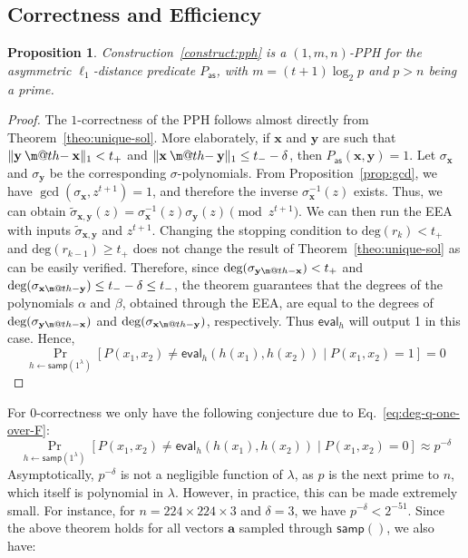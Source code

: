 \documentclass[pdflatex,sn-mathphys-num]{sn-jnl}
\makeatletter
\newcommand{\dotdiv}{\mathbin{\text{\@dotdiv}}}
\newcommand{\@dotdiv}{%
  \ooalign{\hidewidth\raise1ex\hbox{.}\hidewidth\cr$\m@th-$\cr}%
}
\newtheorem{proposition}{Proposition}
\theoremstyle{definition}
\newcommand{\vtr}[1]{\mathbf{#1}}
\newcommand{\norm}[1]{\lVert{#1}\rVert}
\makeatother
\begin{document}
\subsection{Correctness and Efficiency}
\label{subsec:correctness}
\begin{proposition}
\label{prop:scheme-is-pph}
Construction~\ref{construct:pph} is a $(1, m, n)$-PPH for the asymmetric $\ell_1$-distance predicate $P_{\mathsf{as}}$, with $m = (t + 1) \log_2 p$ and $p > n$ being a prime. 
\end{proposition}
\begin{proof}
The $1$-correctness of the PPH follows almost directly from Theorem~\ref{theo:unique-sol}. More elaborately, if $\vtr{x}$ and $\vtr{y}$ are such that $\norm{\vtr{y} \dotdiv \vtr{x}}_1 < t_+$ and $\norm{\vtr{x} \dotdiv \vtr{y}}_1 \leq t_- - \delta$, then $P_{\mathsf{as}}(\vtr{x}, \vtr{y}) = 1$. Let $\sigma_\vtr{x}$ and $\sigma_\vtr{y}$ be the corresponding $\sigma$-polynomials. From Proposition~\ref{prop:gcd}, we have $\gcd (\sigma_\vtr{x}, z^{t+1}) = 1$, and therefore the inverse $\sigma^{-1}_\vtr{x}(z)$ exists. Thus, we can obtain $\tilde{\sigma}_{\vtr{x}, \vtr{y}}(z) =  \sigma^{-1}_\vtr{x}(z) \sigma_\vtr{y}(z) \pmod{z^{t+1}}$. We can then run the EEA with inputs $\tilde{\sigma}_{\vtr{x}, \vtr{y}}$ and $z^{t+1}$. Changing the stopping condition to $\text{deg}(r_{k}) < t_+ $ and $\text{deg}(r_{k-1}) \geq t_+$ does not change the result of Theorem~\ref{theo:unique-sol} as can be easily verified. Therefore, since
$\text{deg}(\sigma_{\vtr{y} \dotdiv \vtr{x}}) < t_+$ and 
$\text{deg}(\sigma_{\vtr{x} \dotdiv \vtr{y}}) \leq t_- - \delta \leq t_-$, the theorem guarantees that the degrees of the polynomials $\alpha$ and $\beta$, obtained through the EEA, are equal to the degrees of $\text{deg}(\sigma_{\vtr{y} \dotdiv \vtr{x}})$ and $\text{deg}(\sigma_{\vtr{x} \dotdiv \vtr{y}})$, respectively. Thus $\mathsf{eval}_h$ will output 1 in this case. Hence,
\[
\Pr_{h \leftarrow \mathsf{samp}(1^\lambda)} \left[ P(x_1, x_2) \neq \mathsf{eval}_h(h(x_1), h(x_2)) \mid P(x_1, x_2) = 1 \right] = 0
\]
\end{proof}
For $0$-correctness we only have the following conjecture due to Eq.~\eqref{eq:deg-q-one-over-F}:
\begin{equation*}
\Pr_{h \leftarrow \mathsf{samp}(1^\lambda)} \left[ P(x_1, x_2) \neq \mathsf{eval}_h(h(x_1), h(x_2)) \mid P(x_1, x_2) = 0 \right] \approx {p^{-\delta}}
\end{equation*}
Asymptotically, $p^{-\delta}$ is not a negligible function of $\lambda$, as $p$ is the next prime to $n$, which itself is polynomial in $\lambda$. However, in practice, this can be made extremely small. For instance, for $n = 224 \times 224 \times 3$ and $\delta = 3$, we have $p^{-\delta} < 2^{-51}$. Since the above theorem holds for all vectors $\vtr{a}$ sampled through $\mathsf{samp}()$, we also have:
\end{document}

